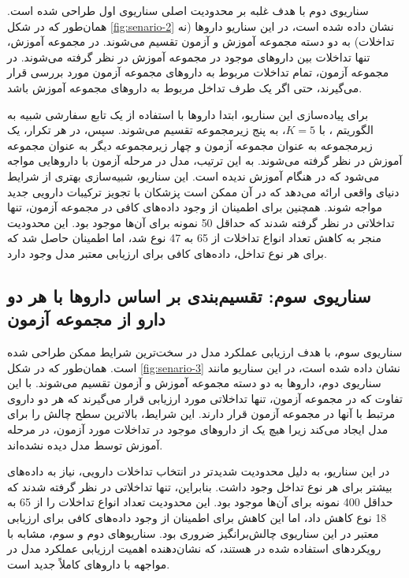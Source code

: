 سناریوی دوم با هدف غلبه بر محدودیت اصلی سناریوی اول طراحی شده است. همان‌طور که در شکل \ref{fig:senario-2} نشان داده شده است، در این سناریو داروها (نه تداخلات) به دو دسته مجموعه آموزش و آزمون تقسیم می‌شوند. در مجموعه آموزش، تنها تداخلات بین داروهای موجود در مجموعه آموزش در نظر گرفته می‌شوند. در مجموعه آزمون، تمام تداخلات مربوط به داروهای مجموعه آزمون مورد بررسی قرار می‌گیرند، حتی اگر یک طرف تداخل مربوط به داروهای مجموعه آموزش باشد.

برای پیاده‌سازی این سناریو، ابتدا داروها با استفاده از یک تابع سفارشی شبیه به الگوریتم ، با $K=5$، به پنج زیرمجموعه تقسیم می‌شوند. سپس، در هر تکرار، یک زیرمجموعه به عنوان مجموعه آزمون و چهار زیرمجموعه دیگر به عنوان مجموعه آموزش در نظر گرفته می‌شوند. به این ترتیب، مدل در مرحله آزمون با داروهایی مواجه می‌شود که در هنگام آموزش ندیده است. این سناریو، شبیه‌سازی بهتری از شرایط دنیای واقعی ارائه می‌دهد که در آن ممکن است پزشکان با تجویز ترکیبات دارویی جدید مواجه شوند. همچنین برای اطمینان از وجود داده‌های کافی در مجموعه آزمون، تنها تداخلاتی در نظر گرفته شدند که حداقل 50 نمونه برای آن‌ها موجود بود. این محدودیت منجر به کاهش تعداد انواع تداخلات از 65 به 47 نوع شد، اما اطمینان حاصل شد که برای هر نوع تداخل، داده‌های کافی برای ارزیابی معتبر مدل وجود دارد.

\subsection{سناریوی سوم: تقسیم‌بندی بر اساس داروها با هر دو دارو از مجموعه آزمون}

سناریوی سوم، با هدف ارزیابی عملکرد مدل در سخت‌ترین شرایط ممکن طراحی شده است. همان‌طور که در شکل \ref{fig:senario-3} نشان داده شده است، در این سناریو مانند سناریوی دوم، داروها به دو دسته مجموعه آموزش و آزمون تقسیم می‌شوند. با این تفاوت که در مجموعه آزمون، تنها تداخلاتی مورد ارزیابی قرار می‌گیرند که هر دو داروی مرتبط با آنها در مجموعه آزمون قرار دارند. این شرایط، بالاترین سطح چالش را برای مدل ایجاد می‌کند زیرا هیچ یک از داروهای موجود در تداخلات مورد آزمون، در مرحله آموزش توسط مدل دیده نشده‌اند.

در این سناریو، به دلیل محدودیت شدیدتر در انتخاب تداخلات دارویی، نیاز به داده‌های بیشتر برای هر نوع تداخل وجود داشت. بنابراین، تنها تداخلاتی در نظر گرفته شدند که حداقل 400 نمونه برای آن‌ها موجود بود. این محدودیت تعداد انواع تداخلات را از 65 به 18 نوع کاهش داد، اما این کاهش برای اطمینان از وجود داده‌های کافی برای ارزیابی معتبر در این سناریوی چالش‌برانگیز ضروری بود. سناریوهای دوم و سوم، مشابه با رویکردهای استفاده شده در \cite{ref_deng2020} هستند، که نشان‌دهنده اهمیت ارزیابی عملکرد مدل در مواجهه با داروهای کاملاً جدید است.

